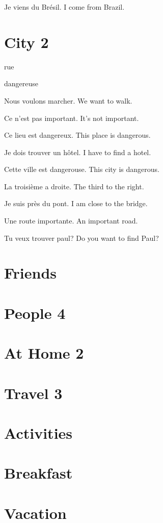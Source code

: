 \documentclass[a4paper,11pt,oneside]{book}
\begin{document}
Je viens du Brésil.
I come from Brazil.



\section{City 2}

rue


dangereuse








Nous voulons marcher.
We want to walk.

Ce n'est pas important.
It's not important.

Ce lieu est dangereux.
This place is dangerous.

Je dois trouver un hôtel.
I have to find a hotel.

Cette ville est dangerouse.
This city is dangerous.

La troisième a droite.
The third to the right.

Je suis près du pont.
I am close to the bridge.

Une route importante.
An important road.

Tu veux trouver paul?
Do you want to find Paul?








\section{Friends}
\section{People 4}
\section{At Home 2}
\section{Travel 3}
\section{Activities}
\section{Breakfast}
\section{Vacation}
\end{document}
